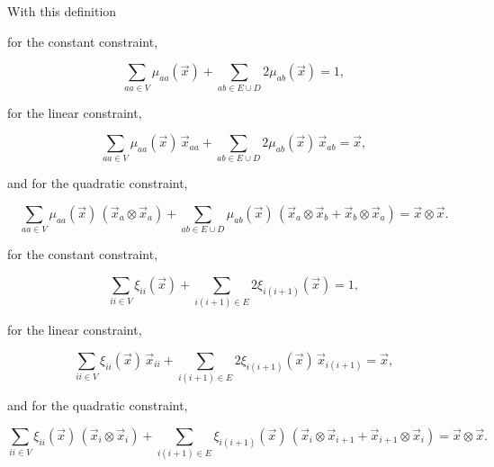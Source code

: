 \noindent With this definition 

for the constant constraint,

\begin{equation}
\label{eq::BF_quad_interp_req_constant_alt}
\sum_{aa \in V}  \mu_{aa} (\vec{x}) + \sum_{ab \in E \cup D} 2 \mu_{ab} (\vec{x})  = 1 ,
\end{equation}

\noindent for the linear constraint,

\begin{equation}
\label{eq::BF_quad_interp_req_linear_alt}
\sum_{aa \in V}  \mu_{aa} (\vec{x}) \, \vec{x}_{aa} +  \sum_{ab \in E \cup D} 2  \mu_{ab} (\vec{x}) \, \vec{x}_{ab} = \vec{x} ,
\end{equation}

\noindent and for the quadratic constraint,

\begin{equation}
\label{eq::BF_quad_interp_req_quadratic_alt}
\sum_{aa \in V}  \mu_{aa} (\vec{x}) \, \left( \vec{x}_a \otimes \vec{x}_a \right) +  \sum_{ab \in E \cup D}   \mu_{ab} (\vec{x}) \, \left( \vec{x}_a \otimes \vec{x}_b + \vec{x}_b \otimes \vec{x}_a \right)   =  \vec{x} \otimes \vec{x} .
\end{equation}


for the constant constraint,

\begin{equation}
\label{eq::BF_ser_interp_req_constant_alt}
\sum_{ii \in V}  \xi_{ii} (\vec{x}) + \sum_{i(i+1) \in E} 2 \xi_{i(i+1)} (\vec{x})  = 1 ,
\end{equation}

\noindent for the linear constraint,

\begin{equation}
\label{eq::BF_ser_interp_req_linear_alt}
\sum_{ii \in V}  \xi_{ii} (\vec{x}) \, \vec{x}_{ii} +  \sum_{i(i+1) \in E} 2  \xi_{i(i+1)} (\vec{x}) \, \vec{x}_{i(i+1)} = \vec{x} ,
\end{equation}

\noindent and for the quadratic constraint,

\begin{equation}
\label{eq::BF_ser_interp_req_quadratic_alt}
\sum_{ii \in V}  \xi_{ii} (\vec{x}) \, \left( \vec{x}_i \otimes \vec{x}_i \right) +  \sum_{i(i+1) \in E}   \xi_{i(i+1)} (\vec{x}) \, \left( \vec{x}_i \otimes \vec{x}_{i+1} + \vec{x}_{i+1} \otimes \vec{x}_i \right)   =  \vec{x} \otimes \vec{x} .
\end{equation}




